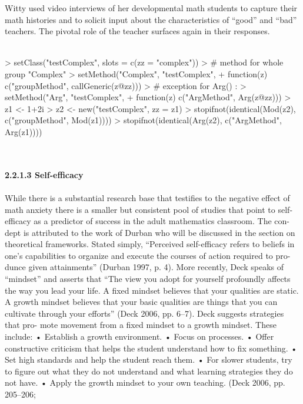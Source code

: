 \documentclass{article}
\begin{document}
 Witty used video interviews of her developmental math students to capture
 their math histories and to solicit input about the characteristics of “good” and
 “bad” teachers. The pivotal role of the teacher surfaces again in their responses.
\textit{\\\\}
\begin{Schunk}
\begin{Sinput}
> setClass("testComplex", slots = c(zz = "complex"))
>  # method for whole group "Complex"
> setMethod("Complex", "testComplex",
+           function(z) c("groupMethod", callGeneric(z@zz)))
>  # exception for Arg() :
> setMethod("Arg", "testComplex",
+           function(z) c("ArgMethod", Arg(z@zz)))
> z1 <- 1+2i
> z2 <- new("testComplex", zz = z1)
> stopifnot(identical(Mod(z2), c("groupMethod", Mod(z1))))
> stopifnot(identical(Arg(z2), c("ArgMethod", Arg(z1))))
\end{Sinput}
\end{Schunk}
\textit{\\\\}
\textbf{ 2.2.1.3 Self-efficacy }
\textit{\\\\}
 While there is a substantial research base that testifies to the negative effect of
 math anxiety there is a smaller but consistent pool of studies that point to self-
   efficacy as a predictor of success in the adult mathematics classroom. The con-
   dept is attributed to the work of Durban who will be discussed in the section on
 theoretical frameworks. Stated simply, “Perceived self-efficacy refers to beliefs in
 one’s capabilities to organize and execute the courses of action required to pro-
   dunce given attainments” (Durban 1997, p. 4). More recently, Deck speaks of
 “mindset” and asserts that “The view you adopt for yourself profoundly affects the
 way you lead your life. A fixed mindset believes that your qualities are static. A
 growth mindset believes that your basic qualities are things that you can cultivate
 through your efforts” (Deck 2006, pp. 6–7). Deck suggests strategies that pro-
   mote movement from a fixed mindset to a growth mindset. These include:
   • Establish a growth environment.
 • Focus on processes.
 • Offer constructive criticism that helps the student understand how to fix
 something.
 • Set high standards and help the student reach them.
 • For slower students, try to figure out what they do not understand and what
 learning strategies they do not have.
 • Apply the growth mindset to your own teaching. (Deck 2006, pp. 205–206;
\end{document}
